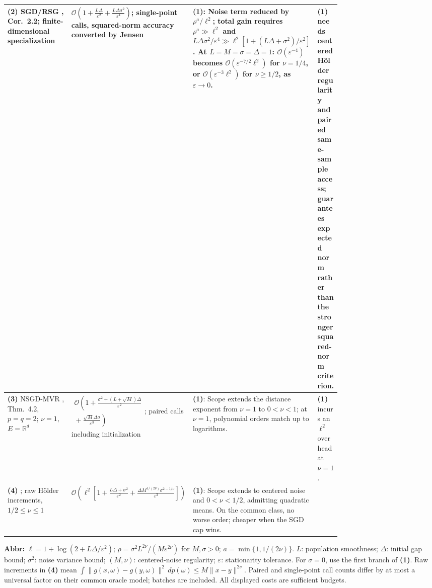 \begin{table}[tp]
\begin{threeparttable}
\begin{tabularx}{\linewidth}{@{}>{\raggedright\arraybackslash}p{0.20\linewidth}>{\raggedright\arraybackslash}p{0.32\linewidth}>{\raggedright\arraybackslash}p{0.25\linewidth}>{\raggedright\arraybackslash}X@{}}
\midrule[1.2pt]
\textbf{(2)} SGD/RSG \citep{rvGhadimiLan2013v1}, Cor.~2.2; finite-dimensional specialization
& $\mathcal{O}\!\left(1+\frac{L\Delta}{\varepsilon^2}+\frac{L\Delta\sigma^2}{\varepsilon^4}\right)$; single-point calls, squared-norm accuracy converted by Jensen
& \textbf{(1)}: Noise term reduced by $\rho^a/\ell^2$; total gain requires $\rho^a\gg\ell^2$ and $L\Delta\sigma^2/\varepsilon^4\gg\ell^2[1+(L\Delta+\sigma^2)/\varepsilon^2]$. At $L=M=\sigma=\Delta=1$: $\mathcal{O}(\varepsilon^{-4})$ becomes $\mathcal{O}(\varepsilon^{-7/2}\ell^2)$ for $\nu=1/4$, or $\mathcal{O}(\varepsilon^{-3}\ell^2)$ for $\nu\ge1/2$, as $\varepsilon\to0$.
& \textbf{(1)} needs centered H\"older regularity and paired same-sample access; guarantees expected norm rather than the stronger squared-norm criterion. \\
\midrule
\textbf{(3)} NSGD-MVR \citep{mshFradin2026v2}, Thm.~4.2, $p=q=2$; $\nu=1$, $E=\mathbb{R}^d$
& $\begin{gathered}\mathcal{O}\!\left(1+\frac{\sigma^2+(L+\sqrt M)\Delta}{\varepsilon^2}\right.\\
\left.{}+\frac{\sqrt M\Delta\sigma}{\varepsilon^3}\right)\end{gathered}$; paired calls including initialization
& \textbf{(1)}: Scope extends the distance exponent from $\nu=1$ to $0<\nu<1$; at $\nu=1$, polynomial orders match up to logarithms.
& \textbf{(1)} incurs an $\ell^2$ overhead at $\nu=1$. \\
\midrule
\textbf{(4)} \citep{hnDyadicRepository2026}; raw H\"older increments, $1/2\le\nu\le1$
& $\mathcal{O}\!\left(\ell^2\left[1+\frac{L\Delta+\sigma^2}{\varepsilon^2}+\frac{\Delta M^{1/(2\nu)}\sigma^{2-1/\nu}}{\varepsilon^3}\right]\right)$
& \textbf{(1)}: Scope extends to centered noise and $0<\nu<1/2$, admitting quadratic means. On the common class, no worse order; cheaper when the SGD cap wins.
& \\
\bottomrule
\end{tabularx}
\begin{tablenotes}[flushleft]\footnotesize
\item[] \textbf{Abbr:} $\ell=1+\log(2+L\Delta/\varepsilon^2)$; $\rho=\sigma^2L^{2\nu}/(M\varepsilon^{2\nu})$ for $M,\sigma>0$; $a=\min\{1,1/(2\nu)\}$. $L$: population smoothness; $\Delta$: initial gap bound; $\sigma^2$: noise variance bound; $(M,\nu)$: centered-noise regularity; $\varepsilon$: stationarity tolerance. For $\sigma=0$, use the first branch of \textbf{(1)}. Raw increments in \textbf{(4)} mean $\int\|g(x,\omega)-g(y,\omega)\|^2\,dp(\omega)\le M\|x-y\|^{2\nu}$. Paired and single-point call counts differ by at most a universal factor on their common oracle model; batches are included. All displayed costs are sufficient budgets.
\end{tablenotes}
\end{threeparttable}
\end{table}
\clearpage
